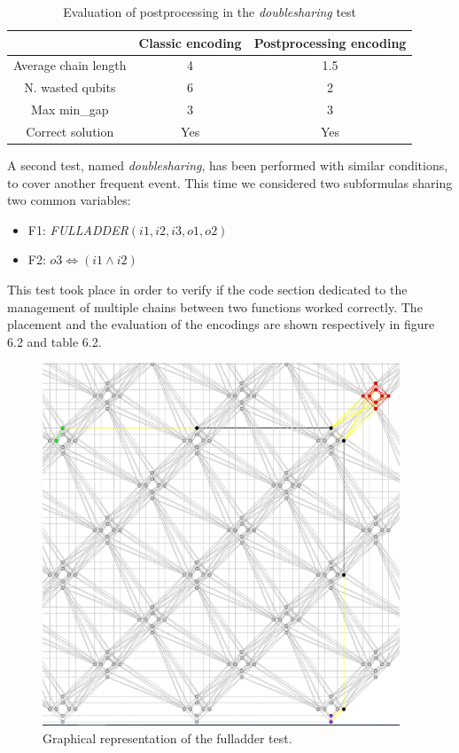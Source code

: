\begin{table}[b]
\centering
\begin{tabular}{|c|c|c|}
\hline
 & \cellcolor[HTML]{FFFE65}Classic encoding & \cellcolor[HTML]{FFFE65}Postprocessing encoding \\ \hline
\cellcolor[HTML]{00D2CB}Average chain length & 4 & 1.5 \\ \hline
\cellcolor[HTML]{00D2CB}N. wasted qubits & 6 & 2 \\ \hline
\cellcolor[HTML]{00D2CB}Max min\_gap & 3 & 3 \\ \hline
\rowcolor[HTML]{67FD9A} 
\cellcolor[HTML]{00D2CB}Correct solution     & Yes                                      & Yes                                             \\ \hline
\end{tabular}
\caption{Evaluation of postprocessing in the \textit{doublesharing} test}
\end{table}

A second test, named \textit{doublesharing}, has been performed with similar conditions, to cover another frequent event. This time we considered two subformulas sharing two common variables:

\begin{itemize}
    \item F1: \textit{FULLADDER}$(i1,i2,i3,o1,o2)$
    \item F2: $o3 \iff (i1 \wedge i2) $
\end{itemize}

This test took place in order to verify if the code section dedicated to the management of multiple chains between two functions worked correctly. The placement and the evaluation of the encodings are shown respectively in figure 6.2 and table 6.2.

\begin{figure}[!]
    \centering
    \includegraphics[width=0.95\textwidth]{images/fulladder.PNG}
    \caption{Graphical representation of the fulladder test.}
    \label{fig:my_label}
\end{figure}


